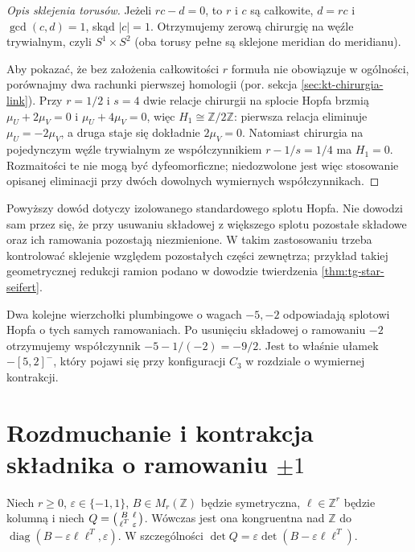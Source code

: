 \begin{proof}[Opis sklejenia torusów]
Jeżeli $rc-d=0$, to $r$ i $c$ są całkowite,
$d=rc$ i $\gcd(c,d)=1$, skąd $|c|=1$.
Otrzymujemy zerową chirurgię na węźle trywialnym,
czyli $S^1\times S^2$ (oba torusy pełne są
sklejone meridian do meridianu).

Aby pokazać, że bez założenia całkowitości $r$
formuła nie obowiązuje w ogólności, porównajmy
dwa rachunki pierwszej homologii (por. sekcja
\ref{sec:kt-chirurgia-link}). Przy
$r=1/2$ i $s=4$ dwie relacje
chirurgii na splocie Hopfa brzmią
$\mu_U+2\mu_V=0$ i
$\mu_U+4\mu_V=0$, więc
$H_1\cong\mathbb Z/2\mathbb Z$:
pierwsza relacja eliminuje $\mu_U=-2\mu_V$,
a druga staje się dokładnie $2\mu_V=0$.
Natomiast chirurgia na pojedynczym
węźle trywialnym ze współczynnikiem
$r-1/s=1/4$ ma
$H_1=0$. Rozmaitości te nie mogą
być dyfeomorficzne; niedozwolone jest
więc stosowanie opisanej eliminacji
przy dwóch dowolnych wymiernych
współczynnikach.
\end{proof}

Powyższy dowód dotyczy izolowanego standardowego
splotu Hopfa. Nie dowodzi sam przez się, że przy
usuwaniu składowej z większego splotu pozostałe
składowe oraz ich ramowania pozostają niezmienione.
W takim zastosowaniu trzeba kontrolować sklejenie
względem pozostałych części zewnętrza; przykład
takiej geometrycznej redukcji ramion podano
w dowodzie twierdzenia \ref{thm:tg-star-seifert}.

\begin{przyklad}
Dwa kolejne wierzchołki plumbingowe o wagach
$-5,-2$ odpowiadają splotowi Hopfa o tych samych
ramowaniach. Po usunięciu składowej o ramowaniu
$-2$ otrzymujemy współczynnik
$-5-1/(-2)=-9/2$. Jest to właśnie ułamek
$-[5,2]^-$, który pojawi się przy konfiguracji
$C_3$ w rozdziale o wymiernej kontrakcji.
\end{przyklad}

\section{Rozdmuchanie i kontrakcja składnika o ramowaniu \texorpdfstring{$\pm1$}{+/-1}}
\label{sec:tg-kirby-blowdown}

\begin{lemat}
\label{lem:tg-audit-schur}
Niech $r\ge0$, $\varepsilon\in\{-1,1\}$,
$B\in M_r(\mathbb Z)$ będzie symetryczna,
$\ell\in\mathbb Z^r$ będzie kolumną i niech
$Q=\begin{psmallmatrix}B&\ell\\\ell^T&\varepsilon\end{psmallmatrix}$. Wówczas jest ona kongruentna nad
$\mathbb Z$ do
$\operatorname{diag}(B-\varepsilon\ell\ell^T,\varepsilon)$.
W szczególności
$\det Q=\varepsilon\det(B-\varepsilon\ell\ell^T)$.
\end{lemat}

